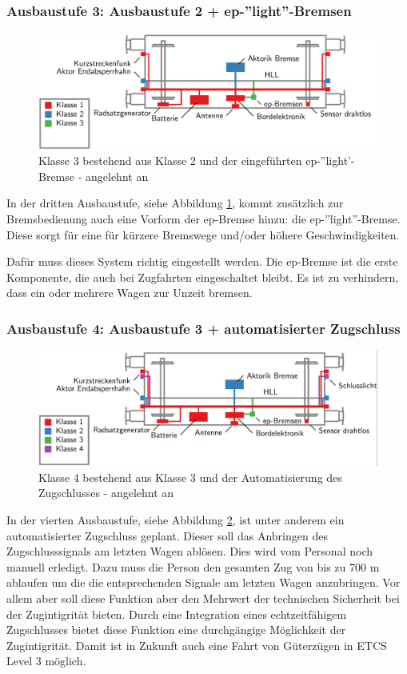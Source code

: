 \subsubsection{Ausbaustufe 3: Ausbaustufe 2 + ep-''light''-Bremsen}
\begin{figure}[htbp] 
    \includegraphics[width=\textwidth]{Bilder/Ausbaustufen_3.PNG}
    \caption{Klasse 3 bestehend aus Klasse 2 und der eingeführten ep-''light'-Bremse - angelehnt an \cite{ETR_3}}
    \label{fig:Klasse3}
\end{figure} 
In der dritten Ausbaustufe, siehe Abbildung \ref{fig:Klasse3}, kommt zusätzlich zur Bremsbedienung auch eine Vorform der \gls{ep-Bremse} hinzu: die ep-''light''-Bremse. Diese sorgt für eine für kürzere Bremswege und/oder höhere Geschwindigkeiten.\par
Dafür muss dieses System richtig eingestellt werden. Die ep-Bremse ist die erste Komponente, die auch bei Zugfahrten eingeschaltet bleibt. Es ist zu verhindern, dass ein oder mehrere Wagen zur Unzeit bremsen.

\subsubsection{Ausbaustufe 4: Ausbaustufe 3 + automatisierter Zugschluss}
\begin{figure}[htbp] 
    \includegraphics[width=\textwidth]{Bilder/Ausbaustufen_4.PNG}
    \caption{Klasse 4 bestehend aus Klasse 3 und der Automatisierung des Zugschlusses - angelehnt an \cite{ETR_3}}
    \label{fig:Klasse4}
\end{figure} 
In der vierten Ausbaustufe, siehe Abbildung \ref{fig:Klasse4}, ist unter anderem ein automatisierter Zugschluss geplant. Dieser soll das Anbringen des Zugschlusssignals am letzten Wagen ablösen. Dies wird vom Personal noch manuell erledigt. Dazu muss die Person den gesamten Zug von bis zu 700 m ablaufen um die die entsprechenden Signale am letzten Wagen anzubringen. Vor allem aber soll diese Funktion aber den Mehrwert der technischen Sicherheit bei der Zugintigrität bieten. Durch eine Integration eines echtzeitfähigem Zugschlusses bietet diese Funktion eine durchgängige Möglichkeit der Zugintigrität. Damit ist in Zukunft auch eine Fahrt von Güterzügen in ETCS Level 3 möglich.

